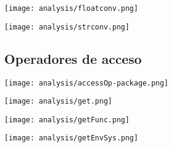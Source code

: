 \begin{multicols}{2}
\begin{center}
\texttt{[image: analysis/floatconv.png]} 
\end{center}
\columnbreak
\begin{center}
\texttt{[image: analysis/strconv.png]} 
\end{center}
\end{multicols}

\subsection {Operadores de acceso}
\begin{center}
\texttt{[image: analysis/accessOp-package.png]} 
\end{center}

\begin{multicols}{2}
\begin{center}
\texttt{[image: analysis/get.png]} 
\end{center}
\columnbreak
\begin{center}
\texttt{[image: analysis/getFunc.png]} 
\end{center}
\end{multicols}

\begin{center}
\texttt{[image: analysis/getEnvSys.png]} 
\end{center}

